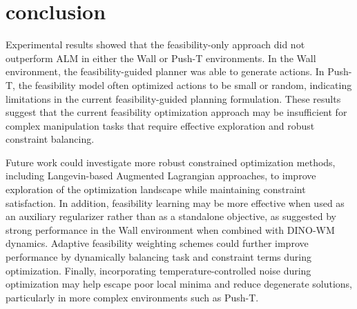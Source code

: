 \section{conclusion}
Experimental results showed that the feasibility-only approach did not outperform ALM in either the Wall or Push-T environments. In the Wall environment, the feasibility-guided planner was able to generate actions. In Push-T, the feasibility model often optimized actions to be small or random, indicating limitations in the current feasibility-guided planning formulation. These results suggest that the current feasibility optimization approach may be insufficient for complex manipulation tasks that require effective exploration and robust constraint balancing.

Future work could investigate more robust constrained optimization methods, including Langevin-based Augmented Lagrangian approaches, to improve exploration of the optimization landscape while maintaining constraint satisfaction. In addition, feasibility learning may be more effective when used as an auxiliary regularizer rather than as a standalone objective, as suggested by strong performance in the Wall environment when combined with DINO-WM dynamics. Adaptive feasibility weighting schemes could further improve performance by dynamically balancing task and constraint terms during optimization. Finally, incorporating temperature-controlled noise during optimization may help escape poor local minima and reduce degenerate solutions, particularly in more complex environments such as Push-T.